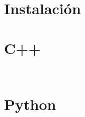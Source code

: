 \documentclass{scrarticle}
\begin{document}
\section{Instalación}

\section{C++}

\begin{listing}[ht!]
	\inputminted{cpp}{../../src/dune-learn.cc}
\end{listing}

\immediate{}

\begin{listing}[ht!]
	\inputminted{bash}{dune-learn-1.txt}
\end{listing}

\section{Python}
\end{document}
